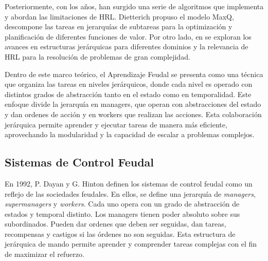 \documentclass[letterpaper]{article} %
\begin{document}
Posteriormente, con los años, han surgido una serie de algoritmos que implementa y abordan las limitaciones de HRL. 
Dietterich \cite{dietterich2000hierarchical} propuso el modelo MaxQ, descompone las tareas en jerarquías de subtareas
para la optimización y planificación de diferentes funciones de valor. Por otro lado, en \cite{barto2003recent} se exploran 
los avances en estructuras jerárquicas para diferentes dominios y la relevancia de HRL para la resolución de problemas de 
gran complejidad.  

Dentro de este marco teórico, el Aprendizaje Feudal se presenta como una técnica que organiza las tareas en niveles jerárquicos, donde cada nivel 
es operado con distintos grados de abstracción tanto en el estado como en temporalidad. Este enfoque \cite{dayan1992feudal} divide la jerarquía en managers, que operan con abstracciones 
del estado y dan ordenes de acción y en workers que realizan las acciones. Esta colaboración jerárquica permite aprender y ejecutar tareas de manera más eficiente, aprovechando
la modularidad y la capacidad de escalar a problemas complejos.

\subsection{Sistemas de Control Feudal}
En 1992, P. Dayan y G. Hinton \cite{dayan1992feudal} definen los sistemas de control feudal como un reflejo de las sociedades feudales. En ellos, se 
define una jerarquía de \textit{managers}, \textit{supermanagers} y \textit{workers}. Cada uno opera con un grado de abstracción de estados y temporal
distinto. Los managers tienen poder absoluto sobre sus subordinados. Pueden dar ordenes que deben ser seguidas, dan tareas, recompensas y castigos si 
las órdenes no son seguidas. Esta estructura de jerárquica de mando permite aprender y comprender tareas complejas con el fin de maximizar el refuerzo.
\end{document}
